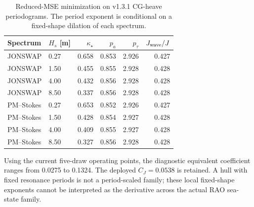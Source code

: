 \begin{table}[t]\centering
\caption{Reduced-MSE minimization on v1.3.1 CG-heave periodograms.
The period exponent is conditional on a fixed-shape dilation of each spectrum.}
\label{tab:adapt-exact-mse-exponents}\footnotesize
\begin{tabular}{@{}llrrrr@{}}\toprule
Spectrum & $H_s$ [m] & $\kappa_\star$ & $p_a$ & $p_\tau$ & $J_{\rm wave}/J$ \\
\midrule
JONSWAP & 0.27 & 0.658 & 0.853 & 2.926 & 0.427 \\
JONSWAP & 1.50 & 0.455 & 0.855 & 2.928 & 0.428 \\
JONSWAP & 4.00 & 0.432 & 0.856 & 2.928 & 0.428 \\
JONSWAP & 8.50 & 0.337 & 0.856 & 2.928 & 0.428 \\
PM--Stokes & 0.27 & 0.653 & 0.852 & 2.926 & 0.427 \\
PM--Stokes & 1.50 & 0.428 & 0.854 & 2.927 & 0.428 \\
PM--Stokes & 4.00 & 0.409 & 0.855 & 2.927 & 0.428 \\
PM--Stokes & 8.50 & 0.327 & 0.856 & 2.928 & 0.428 \\
\bottomrule\end{tabular}\end{table}
Using the current five-draw operating points, the diagnostic equivalent
coefficient ranges from \num{0.0275} to \num{0.1324}.
The deployed $C_J=0.0538$ is retained. A hull with fixed resonance periods
is not a period-scaled family; these local fixed-shape exponents cannot
be interpreted as the derivative across the actual RAO sea-state family.
